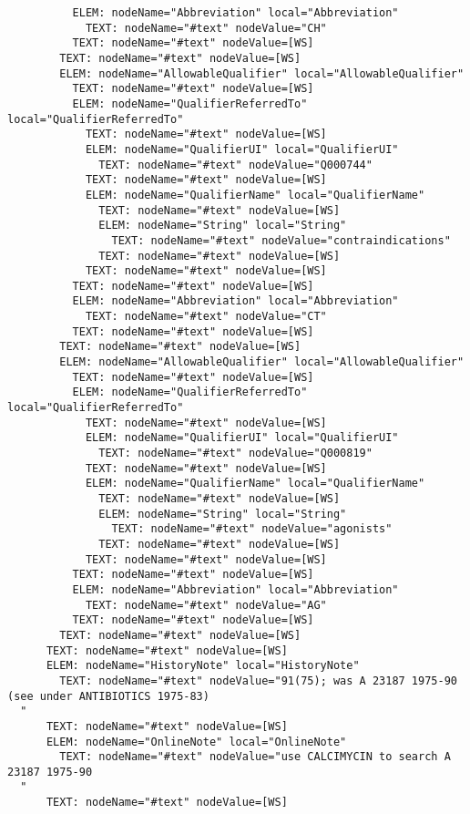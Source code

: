 \documentclass[11pt,english]{article}
\begin{document}
\begin{enumerate}
\begin{lstlisting}
          ELEM: nodeName="Abbreviation" local="Abbreviation"
            TEXT: nodeName="#text" nodeValue="CH"
          TEXT: nodeName="#text" nodeValue=[WS]
        TEXT: nodeName="#text" nodeValue=[WS]
        ELEM: nodeName="AllowableQualifier" local="AllowableQualifier"
          TEXT: nodeName="#text" nodeValue=[WS]
          ELEM: nodeName="QualifierReferredTo" local="QualifierReferredTo"
            TEXT: nodeName="#text" nodeValue=[WS]
            ELEM: nodeName="QualifierUI" local="QualifierUI"
              TEXT: nodeName="#text" nodeValue="Q000744"
            TEXT: nodeName="#text" nodeValue=[WS]
            ELEM: nodeName="QualifierName" local="QualifierName"
              TEXT: nodeName="#text" nodeValue=[WS]
              ELEM: nodeName="String" local="String"
                TEXT: nodeName="#text" nodeValue="contraindications"
              TEXT: nodeName="#text" nodeValue=[WS]
            TEXT: nodeName="#text" nodeValue=[WS]
          TEXT: nodeName="#text" nodeValue=[WS]
          ELEM: nodeName="Abbreviation" local="Abbreviation"
            TEXT: nodeName="#text" nodeValue="CT"
          TEXT: nodeName="#text" nodeValue=[WS]
        TEXT: nodeName="#text" nodeValue=[WS]
        ELEM: nodeName="AllowableQualifier" local="AllowableQualifier"
          TEXT: nodeName="#text" nodeValue=[WS]
          ELEM: nodeName="QualifierReferredTo" local="QualifierReferredTo"
            TEXT: nodeName="#text" nodeValue=[WS]
            ELEM: nodeName="QualifierUI" local="QualifierUI"
              TEXT: nodeName="#text" nodeValue="Q000819"
            TEXT: nodeName="#text" nodeValue=[WS]
            ELEM: nodeName="QualifierName" local="QualifierName"
              TEXT: nodeName="#text" nodeValue=[WS]
              ELEM: nodeName="String" local="String"
                TEXT: nodeName="#text" nodeValue="agonists"
              TEXT: nodeName="#text" nodeValue=[WS]
            TEXT: nodeName="#text" nodeValue=[WS]
          TEXT: nodeName="#text" nodeValue=[WS]
          ELEM: nodeName="Abbreviation" local="Abbreviation"
            TEXT: nodeName="#text" nodeValue="AG"
          TEXT: nodeName="#text" nodeValue=[WS]
        TEXT: nodeName="#text" nodeValue=[WS]
      TEXT: nodeName="#text" nodeValue=[WS]
      ELEM: nodeName="HistoryNote" local="HistoryNote"
        TEXT: nodeName="#text" nodeValue="91(75); was A 23187 1975-90 (see under ANTIBIOTICS 1975-83)
  "
      TEXT: nodeName="#text" nodeValue=[WS]
      ELEM: nodeName="OnlineNote" local="OnlineNote"
        TEXT: nodeName="#text" nodeValue="use CALCIMYCIN to search A 23187 1975-90
  "
      TEXT: nodeName="#text" nodeValue=[WS]

\end{lstlisting}
\end{enumerate}
\end{document}
